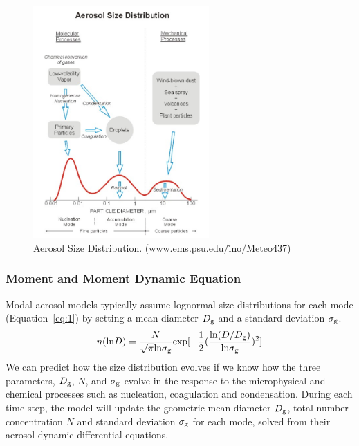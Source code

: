 \documentclass[12pt, fullpage]{uiucthesis2009_2}
\begin{document}
		\begin{figure}[h] 
			\begin{center}
				\includegraphics[width = 0.6\textwidth]{Figure04}
				\caption[Aerosol Size Distribution. (www.ems.psu.edu/\~lno/Meteo437]{\label{fig_P4} Aerosol Size Distribution. (www.ems.psu.edu/\~lno/Meteo437)}
			\end{center}
		\end{figure}
		\subsubsection{Moment and Moment Dynamic Equation}
		Modal aerosol models typically assume lognormal size distributions for each mode (Equation~\ref{eq:1}) by setting a mean diameter $D_{\rm g}$ and a standard deviation $\sigma_{\rm g}$. 
		\begin{align}\label{eq:1}
		n(\text{ln}D) = \frac{N}{\sqrt{\pi}\text{ln}\sigma_{\rm g}}\text{exp}[-\frac{1}{2}(\frac{\text{ln}(D/D_{\rm g})}{\text{ln}\sigma_{\rm g}})^2]
		\end{align}
		We can predict how the size distribution evolves if we know how the three parameters, $D_{\rm g}$, $N$, and $\sigma_{\rm g}$ evolve in the response to the microphysical and chemical processes such as nucleation, coagulation and condensation. During each time step, the model will update the geometric mean diameter $D_{\rm g}$, total number concentration $N$ and standard deviation $\sigma_{\rm g}$ for each mode, solved from their aerosol dynamic differential equations. 
		
\end{document}
